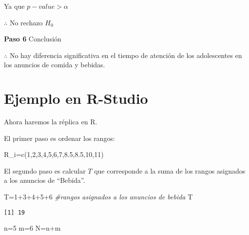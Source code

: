 \documentclass[
  a4paper,
  oneside,
  openany]{book}
\newenvironment{Shaded}{\begin{snugshade}}{\end{snugshade}}
\newcommand{\CommentTok}[1]{\textcolor[rgb]{0.56,0.35,0.01}{\textit{#1}}}
\newcommand{\DecValTok}[1]{\textcolor[rgb]{0.00,0.00,0.81}{#1}}
\newcommand{\FloatTok}[1]{\textcolor[rgb]{0.00,0.00,0.81}{#1}}
\newcommand{\FunctionTok}[1]{\textcolor[rgb]{0.00,0.00,0.00}{#1}}
\newcommand{\NormalTok}[1]{#1}
\newcommand{\OtherTok}[1]{\textcolor[rgb]{0.56,0.35,0.01}{#1}}
\newcommand{\SpecialCharTok}[1]{\textcolor[rgb]{0.00,0.00,0.00}{#1}}
\begin{document}
Ya que \(p-value > \alpha\)

\(\therefore\) No rechazo \(H_0\)

\textbf{Paso 6} Conclusión

\(\therefore\) No hay diferencia significativa en el tiempo de atención de los adolescentes en los anuncios de comida y bebidas.

\hypertarget{ejemplo-en-r-studio-5}{%
\section{Ejemplo en R-Studio}\label{ejemplo-en-r-studio-5}}

Ahora haremos la réplica en R.

El primer paso es ordenar los rangos:

\begin{Shaded}
\begin{Highlighting}[]
\NormalTok{R\_i}\OtherTok{=}\FunctionTok{c}\NormalTok{(}\DecValTok{1}\NormalTok{,}\DecValTok{2}\NormalTok{,}\DecValTok{3}\NormalTok{,}\DecValTok{4}\NormalTok{,}\DecValTok{5}\NormalTok{,}\DecValTok{6}\NormalTok{,}\DecValTok{7}\NormalTok{,}\FloatTok{8.5}\NormalTok{,}\FloatTok{8.5}\NormalTok{,}\DecValTok{10}\NormalTok{,}\DecValTok{11}\NormalTok{)}
\end{Highlighting}
\end{Shaded}

El segundo paso es calcular \(T\) que corresponde a la suma de los rangos asignados a los anuncios de ``Bebida''.

\begin{Shaded}
\begin{Highlighting}[]
\NormalTok{T}\OtherTok{=}\DecValTok{1}\SpecialCharTok{+}\DecValTok{3}\SpecialCharTok{+}\DecValTok{4}\SpecialCharTok{+}\DecValTok{5}\SpecialCharTok{+}\DecValTok{6}  \CommentTok{\#rangos asignados a los anuncios de bebida}
\NormalTok{T}
\end{Highlighting}
\end{Shaded}

\begin{verbatim}
[1] 19
\end{verbatim}

\begin{Shaded}
\begin{Highlighting}[]
\NormalTok{n}\OtherTok{=}\DecValTok{5}
\NormalTok{m}\OtherTok{=}\DecValTok{6}
\NormalTok{N}\OtherTok{=}\NormalTok{n}\SpecialCharTok{+}\NormalTok{m}
\end{Highlighting}
\end{Shaded}
\end{document}
